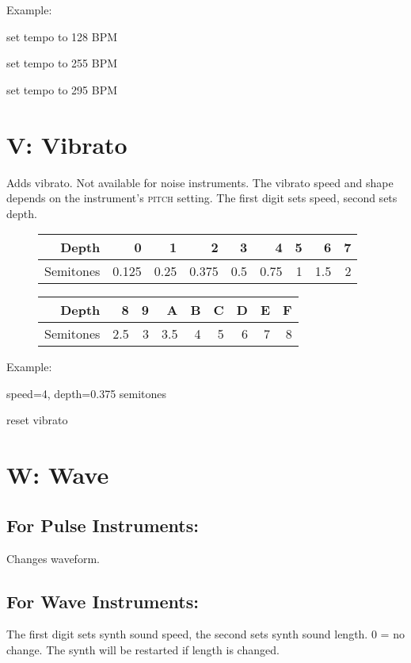 \begin{description}
\item Example:
\item[T80] set tempo to 128 BPM
\item[TFF] set tempo to 255 BPM
\item[T27] set tempo to 295 BPM
\end{description}

\section{V: Vibrato}

Adds vibrato. Not available for noise instruments. The vibrato speed and shape depends on the instrument's \textsc{pitch} setting.
The first digit sets speed, second sets depth.

\begin{figure}[hbtp]
    \begin{tabular}{r|r|r|r|r|r|r|r|r}
        Depth & 0 & 1 & 2 & 3 & 4 & 5 & 6 & 7 \\
        \hline
        Semitones & 0.125 & 0.25 & 0.375 & 0.5 & 0.75 & 1 & 1.5 & 2 \\
    \end{tabular}

    \begin{tabular}{r|r|r|r|r|r|r|r|r}
        Depth & 8 & 9 & A & B & C & D & E & F \\
        \hline
        Semitones & 2.5 & 3 & 3.5 & 4 & 5 & 6 & 7 & 8 \\
    \end{tabular}
\end{figure}

\begin{description}
\item Example:
\item[V42] speed=4, depth=0.375 semitones
\item[V00] reset vibrato
\end{description}

\section{W: Wave}

\subsection{For Pulse Instruments:}
Changes waveform.

\subsection{For Wave Instruments:}
The first digit sets synth sound speed, the second sets synth sound length. 0 = no change. The synth will be restarted if length is changed.

